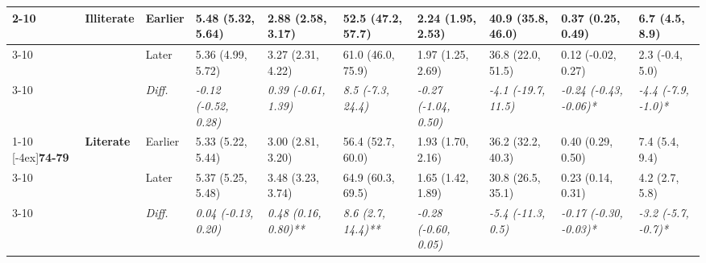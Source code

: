 \documentclass[12pt, a4paper]{article}
\begin{document}
\begin{appendices}
\begin{table}[!p]
{\begin{tabular}[t]{>{}l>{}lllllllll}
        \cmidrule{2-10}
                                              & \multirow{3}{*}{\textbf{Illiterate}} & Earlier                       & 5.48 (5.32, 5.64)                           & 2.88 (2.58, 3.17)                           & 52.5 (47.2, 57.7)                           & 2.24 (1.95, 2.53)                             & 40.9 (35.8, 46.0)                           & 0.37 (0.25, 0.49)                               & 6.7 (4.5, 8.9)                                \\
        \cmidrule{3-10}
                                              &                                      & Later                         & 5.36 (4.99, 5.72)                           & 3.27 (2.31, 4.22)                           & 61.0 (46.0, 75.9)                           & 1.97 (1.25, 2.69)                             & 36.8 (22.0, 51.5)                           & 0.12 (-0.02, 0.27)                              & 2.3 (-0.4, 5.0)                               \\
        \cmidrule{3-10}
                                              &                                      & \cellcolor{gray!10}\em{Diff.} & \cellcolor{gray!10}\em{-0.12 (-0.52, 0.28)} & \cellcolor{gray!10}\em{0.39 (-0.61, 1.39)}  & \cellcolor{gray!10}\em{8.5 (-7.3, 24.4)}    & \cellcolor{gray!10}\em{-0.27 (-1.04, 0.50)}   & \cellcolor{gray!10}\em{-4.1 (-19.7, 11.5)}  & \cellcolor{gray!10}\em{-0.24 (-0.43, -0.06)*}   & \cellcolor{gray!10}\em{-4.4 (-7.9, -1.0)*}    \\
        \cmidrule{1-10}
        \multirow{9}{*}[-4ex]{\textbf{74-79}} & \multirow{3}{*}{\textbf{Literate}}   & Earlier                       & 5.33 (5.22, 5.44)                           & 3.00 (2.81, 3.20)                           & 56.4 (52.7, 60.0)                           & 1.93 (1.70, 2.16)                             & 36.2 (32.2, 40.3)                           & 0.40 (0.29, 0.50)                               & 7.4 (5.4, 9.4)                                \\
        \cmidrule{3-10}
                                              &                                      & Later                         & 5.37 (5.25, 5.48)                           & 3.48 (3.23, 3.74)                           & 64.9 (60.3, 69.5)                           & 1.65 (1.42, 1.89)                             & 30.8 (26.5, 35.1)                           & 0.23 (0.14, 0.31)                               & 4.2 (2.7, 5.8)                                \\
        \cmidrule{3-10}
                                              &                                      & \cellcolor{gray!10}\em{Diff.} & \cellcolor{gray!10}\em{0.04 (-0.13, 0.20)}  & \cellcolor{gray!10}\em{0.48 (0.16, 0.80)**} & \cellcolor{gray!10}\em{8.6 (2.7, 14.4)**}   & \cellcolor{gray!10}\em{-0.28 (-0.60, 0.05)}   & \cellcolor{gray!10}\em{-5.4 (-11.3, 0.5)}   & \cellcolor{gray!10}\em{-0.17 (-0.30, -0.03)*}   & \cellcolor{gray!10}\em{-3.2 (-5.7, -0.7)*}    \\

\end{tabular}}
\end{table}
\end{appendices}
\end{document}
